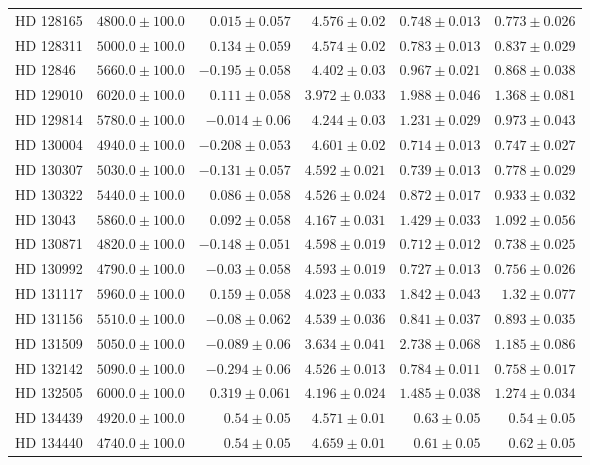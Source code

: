 \begin{longtable*}{lrrrrr}
HD 128165 & $4800.0\pm 100.0$ & $0.015\pm 0.057$ & $4.576\pm 0.02$ & $0.748\pm 0.013$ & $0.773\pm 0.026$ \\ 
HD 128311 & $5000.0\pm 100.0$ & $0.134\pm 0.059$ & $4.574\pm 0.02$ & $0.783\pm 0.013$ & $0.837\pm 0.029$ \\ 
HD 12846 & $5660.0\pm 100.0$ & $-0.195\pm 0.058$ & $4.402\pm 0.03$ & $0.967\pm 0.021$ & $0.868\pm 0.038$ \\ 
HD 129010 & $6020.0\pm 100.0$ & $0.111\pm 0.058$ & $3.972\pm 0.033$ & $1.988\pm 0.046$ & $1.368\pm 0.081$ \\ 
HD 129814 & $5780.0\pm 100.0$ & $-0.014\pm 0.06$ & $4.244\pm 0.03$ & $1.231\pm 0.029$ & $0.973\pm 0.043$ \\ 
HD 130004 & $4940.0\pm 100.0$ & $-0.208\pm 0.053$ & $4.601\pm 0.02$ & $0.714\pm 0.013$ & $0.747\pm 0.027$ \\ 
HD 130307 & $5030.0\pm 100.0$ & $-0.131\pm 0.057$ & $4.592\pm 0.021$ & $0.739\pm 0.013$ & $0.778\pm 0.029$ \\ 
HD 130322 & $5440.0\pm 100.0$ & $0.086\pm 0.058$ & $4.526\pm 0.024$ & $0.872\pm 0.017$ & $0.933\pm 0.032$ \\ 
HD 13043 & $5860.0\pm 100.0$ & $0.092\pm 0.058$ & $4.167\pm 0.031$ & $1.429\pm 0.033$ & $1.092\pm 0.056$ \\ 
HD 130871 & $4820.0\pm 100.0$ & $-0.148\pm 0.051$ & $4.598\pm 0.019$ & $0.712\pm 0.012$ & $0.738\pm 0.025$ \\ 
HD 130992 & $4790.0\pm 100.0$ & $-0.03\pm 0.058$ & $4.593\pm 0.019$ & $0.727\pm 0.013$ & $0.756\pm 0.026$ \\ 
HD 131117 & $5960.0\pm 100.0$ & $0.159\pm 0.058$ & $4.023\pm 0.033$ & $1.842\pm 0.043$ & $1.32\pm 0.077$ \\ 
HD 131156 & $5510.0\pm 100.0$ & $-0.08\pm 0.062$ & $4.539\pm 0.036$ & $0.841\pm 0.037$ & $0.893\pm 0.035$ \\ 
HD 131509 & $5050.0\pm 100.0$ & $-0.089\pm 0.06$ & $3.634\pm 0.041$ & $2.738\pm 0.068$ & $1.185\pm 0.086$ \\ 
HD 132142 & $5090.0\pm 100.0$ & $-0.294\pm 0.06$ & $4.526\pm 0.013$ & $0.784\pm 0.011$ & $0.758\pm 0.017$ \\ 
HD 132505 & $6000.0\pm 100.0$ & $0.319\pm 0.061$ & $4.196\pm 0.024$ & $1.485\pm 0.038$ & $1.274\pm 0.034$ \\ 
HD 134439 & $4920.0\pm 100.0$ & $0.54\pm 0.05$ & $4.571\pm 0.01$ & $0.63\pm 0.05$ & $0.54\pm 0.05$ \\ 
HD 134440 & $4740.0\pm 100.0$ & $0.54\pm 0.05$ & $4.659\pm 0.01$ & $0.61\pm 0.05$ & $0.62\pm 0.05$ \\ 

\end{longtable*}
